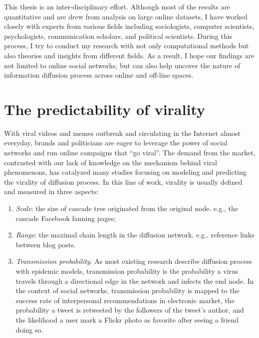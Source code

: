 \documentclass[phd,tocprelim]{cornell}
\begin{document}

This thesis is an inter-disciplinary effort. Although most of the results are quantitative and are drew from analysis on large online datasets, I have worked closely with experts from various fields including sociologists, computer scientists, psychologists, communication scholars, and political scientists. During this process, I try to conduct my research with not only computational methods but also theories and insights from different fields. As a result, I hope our findings are not limited to online social networks, but can also help uncover the nature of information diffusion process across online and off-line spaces.


\section{The predictability of virality}

With viral videos and memes outbreak and circulating in the Internet almost everyday, brands and politicians are eager to leverage the power of social networks and run online campaigns that ``go viral''. The demand from the market, contrasted with our lack of knowledge on the mechanism behind viral phenomenons, has catalyzed many studies focusing on modeling and predicting the virality of diffusion process. In this line of work, virality is usually defined and measured in three aspects: 
\begin{enumerate}
\item \emph{Scale}: the size of cascade tree originated from the original node. e.g., the cascade Facebook fanning pages;
\item \emph{Range}: the maximal chain length in the diffusion network. e.g., reference links between blog posts\cite{Leskovec-SDM-07}. 
\item \emph{Transmission probability}. As most existing research describe diffusion process with epidemic models, transmission probability is the probability a virus travels through a directional edge in the network and infects the end node. In the context of social networks, transmission probability is mapped to  the success rate of interpersonal recommendations in electronic market\cite{Leskovec-EC-2006}, the probability a tweet is retweeted by the followers of the tweet's author\cite{Bakshy-2011}, and the likelihood a user mark a Flickr photo as favorite after seeing a friend doing so\cite{Cha-2009}.
\end{enumerate}
\end{document}
